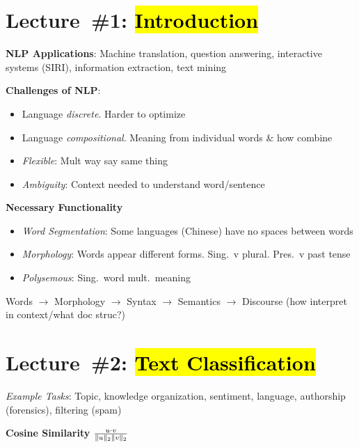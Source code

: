 \documentclass[8pt]{extarticle}
\renewcommand{\green}[1]{{\color{ForestGreen} #1}}
\newcommand{\greenbf}[1]{\textbf{\green{#1}}}
\begin{document}
\setlength{\abovedisplayskip}{0pt}
\setlength{\belowdisplayskip}{0pt}
\setlength{\abovedisplayshortskip}{0pt}
\setlength{\belowdisplayshortskip}{0pt}

\begin{multicols}{3}
  \section*{Lecture~\#1: \hl{Introduction}}

  \textbf{NLP Applications}: Machine translation, question answering, interactive systems (SIRI), information extraction, text mining

  \textbf{Challenges of NLP}:
  \begin{itemize}
    \item Language \textit{discrete}. Harder to optimize
    \item Language \textit{compositional}. Meaning from individual words \& how combine
    \item \textit{Flexible}: Mult way say same thing
    \item \textit{Ambiguity}: Context needed to understand word/sentence
  \end{itemize}

  \textbf{Necessary Functionality}
  \begin{itemize}
    \item \textit{Word Segmentation}: Some languages (Chinese) have no spaces between words
    \item \textit{Morphology}: Words appear different forms. Sing.\ v plural. Pres.\ v past tense
    \item \textit{Polysemous}: Sing.\ word mult.\ meaning
  \end{itemize}

  Words $\rightarrow$ Morphology $\rightarrow$ Syntax $\rightarrow$ Semantics $\rightarrow$ Discourse (how interpret in context/what doc struc?)

  \section*{Lecture~\#2: \hl{Text Classification}}
  \textit{Example Tasks}: Topic, knowledge organization, sentiment, language, authorship (forensics), filtering (spam)

  \greenbf{Cosine Similarity} $\frac{u \cdot v}{\lVert u\rVert_{2} \lVert v\rVert_{2}}$


\end{multicols}
\end{document}
